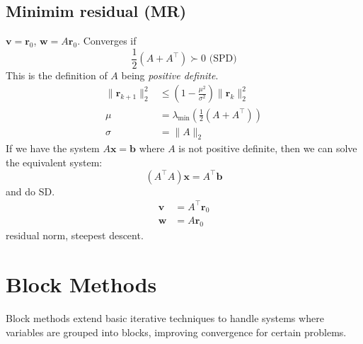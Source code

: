 \subsection*{Minimim residual (MR)}
$\mathbf{v} = \mathbf{r}_0$, $\mathbf{w} = A\mathbf{r}_0$.
Converges if
\[
    \frac12\left(A + A^{\top}\right) \succ 0 \text{ (SPD)}
\]
This is the definition of $A$ being \textit{positive definite}.
\begin{align*}
    \|\mathbf{r}_{k+1}\|_2^2 & \leq \left(1 - \frac{\mu^2}{\sigma^2}\right) \|\mathbf{r}_k\|_2^2 \\
    \mu                      & = \lambda_{\min}\left(\tfrac12(A + A^{\top})\right)               \\
    \sigma                   & = \|A\|_2
\end{align*}
If we have the system $A\mathbf{x} = \mathbf{b}$ where $A$ is not positive definite, then we can solve the equivalent system:
\[
    (A^{\top} A) \mathbf{x} = A^{\top} \mathbf{b}
\]
and do SD.
\begin{align*}
    \mathbf{v} & = A^{\top} \mathbf{r}_0 \\
    \mathbf{w} & = A\mathbf{r}_0
\end{align*}
residual norm, steepest descent.

\section*{Block Methods}
Block methods extend basic iterative techniques to handle systems where variables are grouped into blocks, improving convergence for certain problems.


